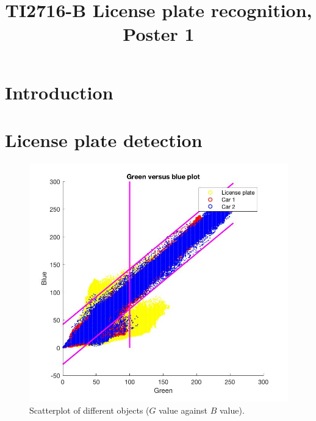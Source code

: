 \documentclass{tudelftposter}
\title{TI2716-B License plate recognition, Poster 1}
\begin{document}
\section{Introduction}


\section{License plate detection}
\begin{figure}[h]
	\centering
	\includegraphics[width=1000pt]{greenblueplot.jpg}
	\caption{Scatterplot of different objects ($G$ value against $B$ value).}
	\label{greenblue}
\end{figure}
\end{document}
